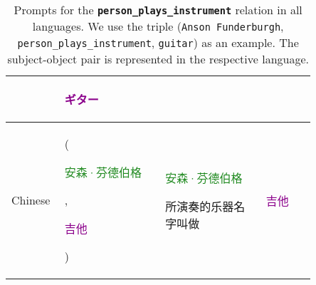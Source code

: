 \begin{table*}[htbp]
\begin{center}
\begin{tabular}{m{0.10\linewidth} p{0.30\linewidth} p{0.30\linewidth} m{0.15\linewidth}}
    & {\centering \textcolor{darkmagenta}{\begin{CJK}{UTF8}{min}ギター\end{CJK}}} \\
\midrule
{\centering Chinese} 
    & {\raggedright (\textcolor{forestgreen}{\begin{CJK}{UTF8}{gbsn}安森·芬德伯格\end{CJK}}, \textcolor{darkmagenta}{\begin{CJK}{UTF8}{gbsn}吉他\end{CJK}})}
    & \textcolor{forestgreen}{\begin{CJK}{UTF8}{gbsn}安森·芬德伯格\end{CJK}}\begin{CJK}{UTF8}{gbsn}所演奏的乐器名字叫做\end{CJK}
    & {\centering \textcolor{darkmagenta}{\begin{CJK}{UTF8}{gbsn}吉他\end{CJK}}} \\
\bottomrule
\end{tabular}
\end{center}
\caption{Prompts for the \textbf{\texttt{person\_plays\_instrument}} relation in all languages. We use the triple (\texttt{Anson Funderburgh}, \texttt{person\_plays\_instrument}, \texttt{guitar}) as an example. The subject-object pair is represented in the respective language.}
\label{tab:prompts_person_plays_instrument}
\end{table*}

